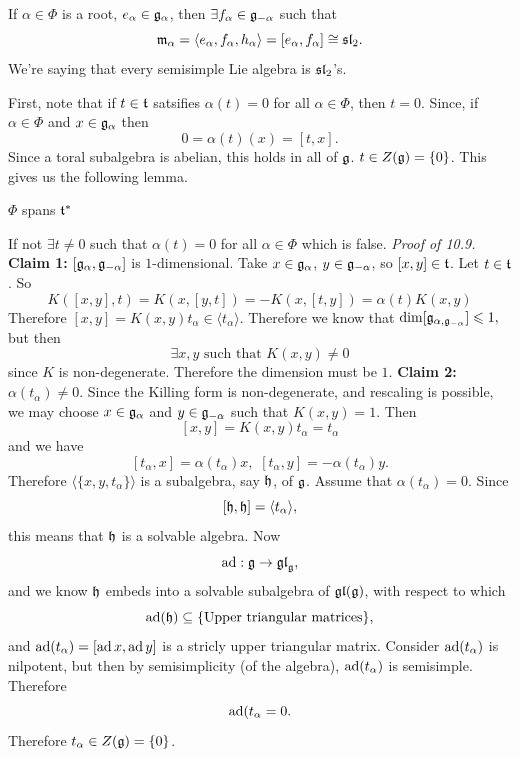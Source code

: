 \documentclass{article}
\begin{document}
\begin{fancyprop}{}
    If $\alpha \in \Phi$ is a root, $e_{\alpha} \in \mathfrak{g}_{\alpha}$, then $\exists f_{\alpha} \in \mathfrak{g}_{-\alpha}$ such that \[ \mathfrak{m}_{\alpha} = \langle e_{\alpha}, f_{\alpha}, h_{\alpha} \rangle=[e_{\alpha},f_{\alpha}] \cong \mathfrak{sl}_{2}.\] We're saying that every semisimple Lie algebra is  $\mathfrak{sl}_{2}$'s.
\end{fancyprop}
First, note that if $t \in \mathfrak{t}$ satsifies $\alpha(t)=0$ for all $\alpha \in \Phi$, then $t=0$. Since, if $\alpha \in \Phi$ and $x \in \mathfrak{g}_{\alpha}$ then \[ 0 = \alpha(t)(x) = [t,x].\] Since a toral subalgebra is abelian, this holds in all of $\mathfrak{g}$. $t \in Z(\mathfrak{g}) = \{ 0 \}$. This gives us the following lemma.
\begin{fancylem}{}
    $\Phi$ spans $\mathfrak{t}^{*}$
\end{fancylem}
\proof If not $\exists t \neq 0$ such that $\alpha(t)=0$ for all $\alpha \in \Phi$ which is false. \endproof
\textit{Proof of 10.9.}\hspace{0.1cm}\gap
\textbf{Claim 1:} $[\mathfrak{g}_{\alpha},\mathfrak{g}_{-\alpha}]$ is $1$-dimensional. \gap
Take $x \in \mathfrak{g}_{\alpha}$, $y \in \mathfrak{g}_{-\alpha}$, so $[x,y] \in \mathfrak{t}$. Let $t \in \mathfrak{t}$. So \[ K([x,y],t) = K(x,[y,t]) = -K(x,[t,y]) = \alpha(t)K(x,y)\]
Therefore $[x,y]=K(x,y)t_{\alpha} \in \langle t_{\alpha} \rangle.$ Therefore we know that $\dim [\mathfrak{g}_{\alpha, \mathfrak{g}_{-\alpha}}] \leqslant 1,$ but then \[ \exists x,y \text{ such that } K(x,y) \neq 0\] since $K$ is non-degenerate. Therefore the dimension must be $1$. \gap 
\textbf{Claim 2:} $\alpha(t_{\alpha}) \neq 0$. \gap 
Since the Killing form is non-degenerate, and rescaling is possible, we may choose $x \in \mathfrak{g}_{\alpha}$ and $y \in \mathfrak{g}_{-\alpha}$ such that $K(x,y)=1$. Then \[ [x,y] = K(x,y) t_{\alpha} = t_{\alpha}\] and we have \[ [t_{\alpha}, x] = \alpha(t_{\alpha})x, \, \, [t_{\alpha},y]= -\alpha(t_{\alpha})y.\] Therefore $\langle \{x,y,t_{\alpha} \} \rangle$ is a subalgebra, say $\mathfrak{h}$, of $\mathfrak{g}$. Assume that $\alpha(t_{\alpha})=0$. Since \[ [\mathfrak{h}, \mathfrak{h}] = \langle t_{\alpha} \rangle, \] this means that $\mathfrak{h}$ is a solvable algebra.
Now \[ \operatorname{ad} : \mathfrak{g} \to \mathfrak{gl}_{\mathfrak{g}},\] and we know $\mathfrak{h}$ embeds into a solvable subalgebra of $\mathfrak{gl}(\mathfrak{g})$, with respect to which \[ \operatorname{ad}(\mathfrak{h}) \subseteq \{ \text{Upper triangular matrices} \}, \] and $\operatorname{ad}(t_{\alpha}) = [ \operatorname{ad} x, \operatorname{ad} y]$ is a stricly upper triangular matrix. Consider $\operatorname{ad}(t_{\alpha})$ is nilpotent, but then by semisimplicity (of the algebra), $\operatorname{ad}(t_{\alpha})$ is semisimple. Therefore \[\operatorname{ad}(t_{\alpha} = 0.\] Therefore $t_{\alpha} \in Z(\mathfrak{g}) = \{0 \}$. \gap
\end{document}
